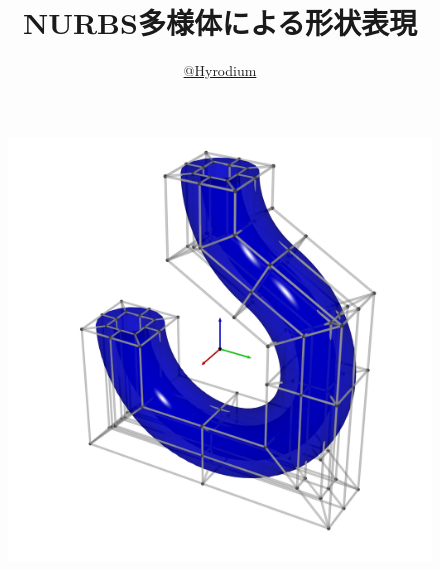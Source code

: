 \documentclass{jsarticle}
\title{NURBS多様体による形状表現}
\author{\href{https://twitter.com/hyrodium}{@Hyrodium}}
\theoremstyle{definition}%
\begin{document}
\maketitle
\vspace{2em}
\begin{figure}[H]
	\centering
    \includegraphics[width=160mm]{cover.png}
\end{figure}

\thispagestyle{empty}
\newpage

\end{document}
